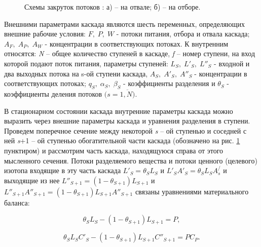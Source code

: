 \begin{figure}[ht]
  \caption{Схемы закруток потоков : а) -- на отвале; б) -- на отборе.}\label{loop}
\end{figure}


Внешними параметрами каскада являются шесть переменных, определяющих внешние рабочие условия: $F,\; P,\; W$ - потоки питания, отбора и отвала каскада; $A_{F} ,\; A_{P} ,\; A_{W}$ - концентрации в соответствующих потоках. К внутренним относятся: \textit{N} -- общее количество ступеней в каскаде, \textit{f} -- номер ступени, на вход которой подают поток питания, параметры ступеней: $L_{S} ,\; L'_{S} ,\; L''_{S} $ - входной и два выходных потока на s-ой ступени каскада, $A_{S} ,\; A'_{S} ,\; A''_{S} \; $- концентрации в соответствующих потоках; $q_{S} ,\; \alpha _{S} ,\; \beta _{S} $ - коэффициенты разделения и $\theta _{S} $ - коэффициенты деления потоков $(s=\overline{1,N)}$.

В стационарном состоянии каскада внутренние параметры каскада можно выразить через внешние параметры каскада и уравнения разделения в ступени. Проведем поперечное сечение между некоторой \textit{s} -- ой ступенью и соседней с ней \textit{s}+1 -- ой ступенью обогатительной части каскада (обозначено на рис. \ref*{loop} пунктиром) и рассмотрим часть каскада, находящуюся справа от этого мысленного сечения. Потоки разделяемого вещества и потоки ценного (целевого) изотопа входящие в эту часть каскада $L'_{S} =\theta _{S} L_{S} $ и $L'_{S} A'_{S} =\theta _{S} L_{S} A_{s}^{/} $ и выходящие из нее $L''_{S+1} =(1-\theta _{S+1} )L_{S+1} $ и $L''_{S+1} A''_{S+1} =(1-\theta _{S+1} )L_{S+1} A''_{S+1} $ связаны уравнениями материального баланса:

\begin{equation} \label{GrindEQ__1_71_} 
\theta _{S} L_{S} -(1-\theta _{S+1} )L_{S+1} =P,                
\end{equation} 

\begin{equation} \label{GrindEQ__1_72_} 
\theta _{S} L_{S} C'_{S} -(1-\theta _{S+1} )L_{S+1} C''_{S+1} =PC_{P}.     
\end{equation} 

